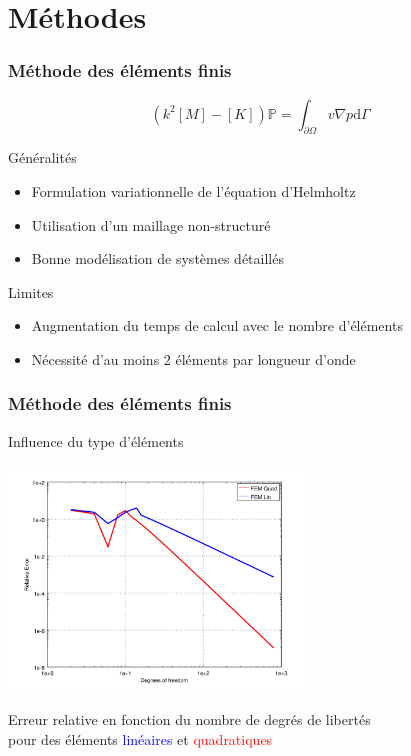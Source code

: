 \documentclass[10pt, compress]{beamer}
\newcommand\GP{\mathbb{P}}
\begin{document}
\section{Méthodes}

\begin{frame}
	\frametitle{Méthode des éléments finis}

	$$\left(k^2[M] - [K]\right)\GP = \int_{\partial\Omega} v\nabla p\mathrm{d}\Gamma$$

	\begin{block}{Généralités}
		\begin{itemize}
			\item Formulation variationnelle de l'équation d'Helmholtz
			\item Utilisation d'un maillage non-structuré
			\item Bonne modélisation de systèmes détaillés
		\end{itemize}
	\end{block}
	\pause
	\begin{block}{Limites}
		\begin{itemize}
			\item Augmentation du temps de calcul avec le nombre d'éléments
			\item Nécessité d'au moins 2 éléments par longueur d'onde
		\end{itemize}
	\end{block}
\end{frame}

\begin{frame}
	\frametitle{Méthode des éléments finis}

	\begin{block}{Influence du type d'éléments}
		\pause 
		\begin{center}
		\includegraphics[width=0.6\textwidth]{../report/part1/figs/FEM/simuls_1D/convergence.png}

        \footnotesize{Erreur relative en fonction du nombre de degrés de libertés\\
        pour des éléments \textcolor{blue}{linéaires} et \textcolor{red}{quadratiques}}
		\end{center}
	\end{block}
\end{frame}
\end{document}

